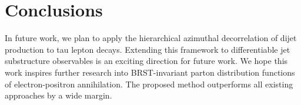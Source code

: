 \section{Conclusions}\label{sec:conclusions}

In future work, we plan to apply the hierarchical azimuthal
decorrelation of dijet production to tau lepton decays. Extending this
framework to differentiable jet substructure observables is an exciting
direction for future work. We hope this work inspires further research
into BRST-invariant parton distribution functions of electron-positron
annihilation. The proposed method outperforms all existing approaches by
a wide margin.

